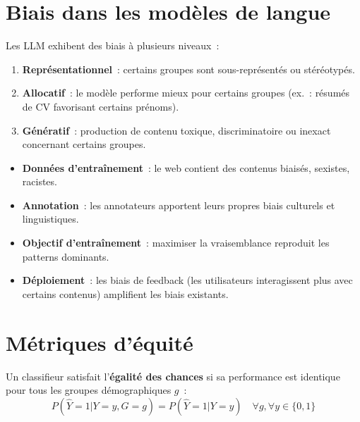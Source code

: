 \section{Biais dans les mod\`eles de langue}
\label{sec:ethique:lm_bias}

\begin{definition}
Les LLM exhibent des biais \`a plusieurs niveaux~:
\begin{enumerate}
    \item \textbf{Repr\'esentationnel}~: certains groupes sont
    sous-repr\'esent\'es ou st\'er\'eotyp\'es.
    \item \textbf{Allocatif}~: le mod\`ele performe mieux pour certains
    groupes (ex.~: r\'esum\'es de CV favorisant certains pr\'enoms).
    \item \textbf{G\'en\'eratif}~: production de contenu toxique,
    discriminatoire ou inexact concernant certains groupes.
\end{enumerate}
\end{definition}

\begin{proposition}
\begin{itemize}
    \item \textbf{Donn\'ees d'entra\^inement}~: le web contient des
    contenus biais\'es, sexistes, racistes.
    \item \textbf{Annotation}~: les annotateurs apportent leurs propres
    biais culturels et linguistiques.
    \item \textbf{Objectif d'entra\^inement}~: maximiser la vraisemblance
    reproduit les patterns dominants.
    \item \textbf{D\'eploiement}~: les biais de feedback (les utilisateurs
    interagissent plus avec certains contenus) amplifient les biais
    existants.
\end{itemize}
\end{proposition}

\section{M\'etriques d'\'equit\'e}
\label{sec:ethique:metriques}

\begin{definition}
Un classifieur satisfait l'\textbf{\'egalit\'e des chances} si sa
performance est identique pour tous les groupes d\'emographiques $g$~:
\[
    P(\hat{Y} = 1 | Y = y, G = g) = P(\hat{Y} = 1 | Y = y)
    \quad \forall g, \forall y \in \{0, 1\}
\]
\end{definition}

